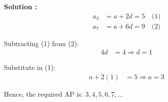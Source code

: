 \documentclass[a4paper,12pt]{article}
\begin{document}
\textbf{Solution :}
\begin{align*}
a_3 &= a + 2d = 5 \quad \text{(1)} \\
a_7 &= a + 6d = 9 \quad \text{(2)}
\end{align*}

Subtracting (1) from (2):
\begin{align*}
4d &= 4 \Rightarrow d = 1
\end{align*}

Substitute in (1):
\begin{align*}
a + 2(1) &= 5 \Rightarrow a = 3
\end{align*}

Hence, the required AP is: $3, 4, 5, 6, 7, \dots$
\end{document}
